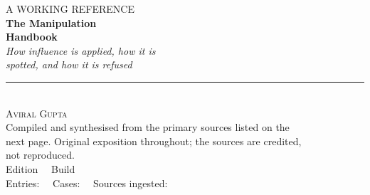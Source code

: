 \begin{titlepage}
\thispagestyle{empty}
\vspace*{18mm}
\begin{center}
{\small\MakeUppercase{A working reference}}\\[8mm]
{\Huge\bfseries The Manipulation\\[2mm] Handbook}\\[9mm]
{\large\itshape{} How influence is applied, how it is\\ spotted, and how it is refused}\\[16mm]
\rule{0.45\textwidth}{0.4pt}\\[7mm]
{\large\scshape Aviral Gupta}\\[2.5mm]
{\footnotesize
{}
Compiled and synthesised from the primary sources listed on the\\
next page. Original exposition throughout; the sources are credited,\\
not reproduced.}\\[16mm]
{\footnotesize{}
Edition \hbedition\ \textbullet\ Build \hbbuildstamp\\[2mm]
Entries: \hbtopiccount\ \textbullet\ Cases: \hbcasecount\ \textbullet\ Sources ingested: \hbbookcount}
\end{center}
\vfill
\end{titlepage}
